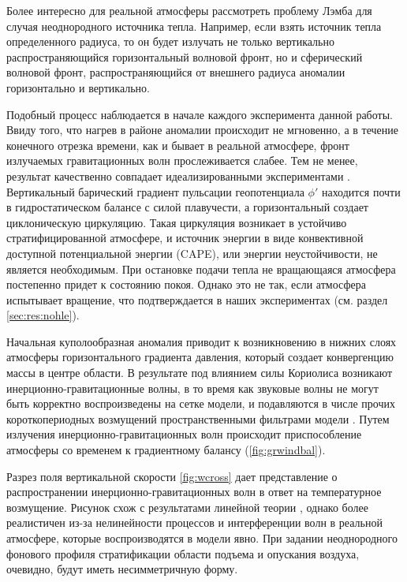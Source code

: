 Более интересно для реальной атмосферы рассмотреть проблему Лэмба для случая неоднородного источника тепла. Например, если взять источник тепла определенного радиуса, то он будет излучать не только вертикально распространяющийся горизонтальный волновой фронт, но и сферический волновой фронт, распространяющийся от внешнего радиуса аномалии горизонтально и вертикально. 

Подобный процесс наблюдается в начале каждого эксперимента данной работы. Ввиду того, что нагрев в районе аномалии происходит не мгновенно, а в течение конечного отрезка времени, как и бывает в реальной атмосфере,  фронт излучаемых гравитационных волн прослеживается слабее. Тем не менее, результат качественно совпадает идеализированными экспериментами \citep{RT2003}. Вертикальный барический градиент пульсации геопотенциала $\phi'$ находится почти в гидростатическом балансе с силой плавучести, а горизонтальный создает циклоническую циркуляцию. Такая циркуляция возникает в устойчиво стратифицированной атмосфере, и источник энергии в виде конвективной доступной потенциальной энергии (CAPE), или энергии неустойчивости, не является необходимым. При остановке подачи тепла не вращающаяся атмосфера постепенно придет к состоянию покоя. Однако это не так, если атмосфера испытывает вращение, что подтверждается в наших экспериментах (см. раздел \ref{sec:res:nohle}).

\begin{wrapfigure}{l}{0.5\textwidth}
\begin{center}
\texttt{[image: \{./chapters/figures\_results/slpmin\_vortmax.00h-43h.ctrl]}.png}
\end{center}
\caption{Изменение аномалии приземного давления и максимальной завихренности во времени. Эксперимент CTRL.}
\label{fig:ctrl_slpminvortmax}
\end{wrapfigure}

Начальная куполообразная аномалия приводит к возникновению в нижних слоях атмосферы горизонтального градиента давления, который создает конвергенцию массы в центре области. В результате под влиянием силы Кориолиса возникают инерционно-гравитационные волны, в то время как  звуковые волны не могут быть корректно воспроизведены на сетке модели, и подавляются в числе прочих короткопериодных возмущений пространственными фильтрами модели \citep{MillerWhite1984,MirandaPhD}. Путем излучения инерционно-гравитационных волн происходит приспособление атмосферы со временем к градиентному балансу (\ref{fig:grwindbal}).

Разрез поля вертикальной скорости \ref{fig:wcross} дает представление о распространении инерционно-гравитационных волн в ответ на температурное возмущение. Рисунок схож с результатами линейной теории \citep{Lin2007}, однако более реалистичен из-за нелинейности процессов и интерференции волн в реальной атмосфере, которые воспроизводятся в модели явно. При задании неоднородного фонового профиля стратификации области подъема и опускания воздуха, очевидно, будут иметь несимметричную форму.

